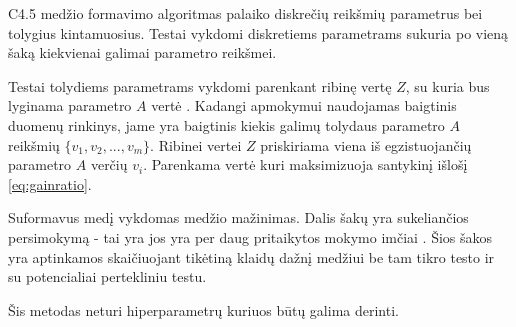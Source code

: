 C4.5 medžio formavimo algoritmas palaiko diskrečių reikšmių parametrus bei tolygius kintamuosius.
Testai vykdomi diskretiems parametrams sukuria po vieną šaką kiekvienai galimai parametro reikšmei.

Testai tolydiems parametrams vykdomi parenkant ribinę vertę $Z$, su kuria bus lyginama parametro
$A$ vertė \cite{c45}. Kadangi apmokymui naudojamas baigtinis duomenų rinkinys, jame yra baigtinis
kiekis galimų tolydaus parametro $A$ reikšmių $\{v_1, v_2, ..., v_m\}$. Ribinei vertei $Z$ priskiriama
viena iš egzistuojančių parametro $A$ verčių  $v_i$. Parenkama vertė kuri maksimizuoja
santykinį išlošį \ref{eq:gainratio}.

Suformavus medį vykdomas medžio mažinimas. Dalis šakų yra sukeliančios persimokymą - tai yra
jos yra per daug pritaikytos mokymo imčiai \cite{c45}. Šios šakos yra aptinkamos skaičiuojant
tikėtiną klaidų dažnį medžiui be tam tikro testo ir su potencialiai pertekliniu testu.

Šis metodas neturi hiperparametrų kuriuos būtų galima derinti.